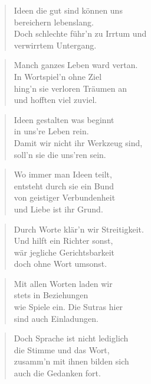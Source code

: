 \documentclass[10pt,a4paper]{article}
\begin{document}
\begin{multicols}{2}
\begin{verse}
Ideen die gut sind können uns \\
bereichern lebenslang. \\
Doch schlechte führ’n zu Irrtum und \\
verwirrtem Untergang. \\
\end{verse}

\begin{verse}
Manch ganzes Leben ward vertan. \\
In Wortspiel’n ohne Ziel \\
hing’n sie verloren Träumen an \\
und hofften viel zuviel. \\
\end{verse}

\begin{verse}
Ideen gestalten was beginnt \\
in uns’re Leben rein. \\
Damit wir nicht ihr Werkzeug sind, \\
soll’n sie die uns’ren sein. \\
\end{verse}

\begin{verse}
Wo immer man Ideen teilt, \\
entsteht durch sie ein Bund \\
von geistiger Verbundenheit \\
und Liebe ist ihr Grund. \\
\end{verse}

\begin{verse}
Durch Worte klär’n wir Streitigkeit. \\
Und hilft ein Richter sonst, \\
wär jegliche Gerichtsbarkeit \\
doch ohne Wort umsonst. \\
\end{verse}

\begin{verse}
Mit allen Worten laden wir \\
stets in Beziehungen \\
wie Spiele ein. Die Sutras hier \\
sind auch Einladungen. \\
\end{verse}

\begin{verse}
Doch Sprache ist nicht lediglich \\
die Stimme und das Wort, \\
zusamm’n mit ihnen bilden sich \\
auch die Gedanken fort. \\
\end{verse}


\end{multicols}
\end{document}
